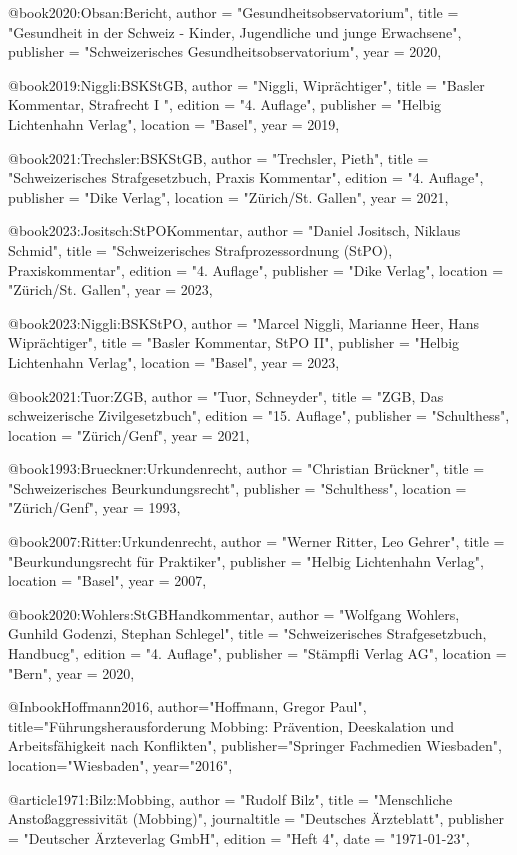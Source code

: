 @book{2020:Obsan:Bericht,
	author = "Gesundheitsobservatorium", 
	title = "Gesundheit in der Schweiz - Kinder, Jugendliche und junge Erwachsene",
	publisher = "Schweizerisches Gesundheitsobservatorium",
	year = 2020,
}

@book{2019:Niggli:BSKStGB,
	author  = "Niggli, Wiprächtiger",
	title = "Basler Kommentar, Strafrecht I ",
	edition = "4. Auflage",
	publisher = "Helbig Lichtenhahn Verlag",
	location = "Basel",
	year = 2019,
}

@book{2021:Trechsler:BSKStGB,
	author  = "Trechsler, Pieth",
	title = "Schweizerisches Strafgesetzbuch, Praxis Kommentar",
	edition = "4. Auflage",
	publisher = "Dike Verlag",
	location = "Zürich/St. Gallen",
	year = 2021,
}

@book{2023:Jositsch:StPOKommentar,
	author  = "Daniel Jositsch, Niklaus Schmid",
	title = "Schweizerisches Strafprozessordnung (StPO), Praxiskommentar",
	edition = "4. Auflage",
	publisher = "Dike Verlag",
	location = "Zürich/St. Gallen",
	year = 2023,
}

@book{2023:Niggli:BSKStPO,
	author  = "Marcel Niggli, Marianne Heer, Hans Wiprächtiger",
	title = "Basler Kommentar, StPO II",
	publisher = "Helbig Lichtenhahn Verlag",
	location = "Basel",
	year = 2023,
}


@book{2021:Tuor:ZGB,
	author  = "Tuor, Schneyder",
	title = "ZGB, Das schweizerische Zivilgesetzbuch",
	edition = "15. Auflage",
	publisher = "Schulthess",
	location = "Zürich/Genf",
	year = 2021,
}

@book{1993:Brueckner:Urkundenrecht,
	author  = "Christian Brückner",
	title = "Schweizerisches Beurkundungsrecht",
	publisher = "Schulthess",
	location = "Zürich/Genf",
	year = 1993,
}

@book{2007:Ritter:Urkundenrecht,
	author  = "Werner Ritter, Leo Gehrer",
	title = "Beurkundungsrecht für Praktiker",
	publisher = "Helbig Lichtenhahn Verlag",
	location = "Basel",
	year = 2007,
}

@book{2020:Wohlers:StGBHandkommentar,
	author  = "Wolfgang Wohlers, Gunhild Godenzi, Stephan Schlegel",
	title = "Schweizerisches Strafgesetzbuch, Handbucg",
	edition = "4. Auflage",
	publisher = "Stämpfli Verlag AG",
	location = "Bern",
	year = 2020,
}

@Inbook{Hoffmann2016,
	author="Hoffmann, Gregor Paul",
	title="F{\"u}hrungsherausforderung Mobbing: Pr{\"a}vention, Deeskalation und Arbeitsf{\"a}higkeit nach Konflikten",
	publisher="Springer Fachmedien Wiesbaden",
	location="Wiesbaden",
	year="2016",
}

@article{1971:Bilz:Mobbing,
	author = "Rudolf Bilz",
	title = "Menschliche Anstoßaggressivität (Mobbing)",
	journaltitle = "Deutsches Ärzteblatt",
	publisher = "Deutscher Ärzteverlag GmbH",
	edition = "Heft 4",
	date = "1971-01-23",
}
